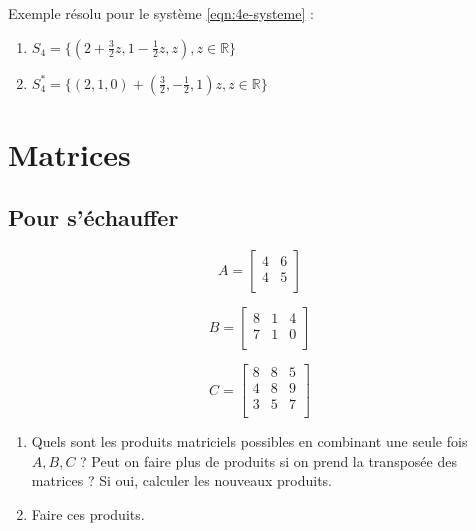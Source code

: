 \documentclass[a4paper]{article}\usepackage[]{graphicx}\usepackage[]{xcolor}
\newcommand{\R}{\mathbb{R}}
\begin{document}
Exemple résolu pour le système \ref{eqn:4e-systeme} :
\begin{enumerate}
    \item $S_4 = \{(2 + \frac{3}{2}z, 1 - \frac{1}{2} z, z), z\in\R\}$
    \item $S_4^* = \{(2, 1, 0) + (\frac{3}{2},  - \frac{1}{2} , 1)z, z\in\R\}$

\end{enumerate}

\section*{Matrices}

\subsection*{Pour s'échauffer}



\begin{minipage}{0.33\linewidth}
    \begin{equation*}
        A = \begin{bmatrix} 4 &6 \\4 &5 \\ \end{bmatrix}
    \end{equation*}
\end{minipage}
\begin{minipage}{0.33\linewidth}
    \begin{equation*}
        B = \begin{bmatrix} 8 &1 &4 \\7 &1 &0 \\ \end{bmatrix}
    \end{equation*}
\end{minipage}
\begin{minipage}{0.33\linewidth}
    \begin{equation*}
        C = \begin{bmatrix} 8 &8 &5 \\4 &8 &9 \\3 &5 &7 \\ \end{bmatrix}
    \end{equation*}
\end{minipage}

\begin{enumerate}
    \item Quels sont les produits matriciels possibles en combinant une seule 
    fois $A, B, C$ ? Peut on faire plus de produits si on prend la 
    transposée des matrices ? Si oui, calculer les nouveaux produits.
    \item Faire ces produits.
\end{enumerate}
\end{document}
